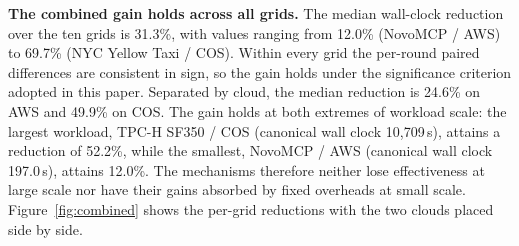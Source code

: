 \textbf{The combined gain holds across all grids.}
The median wall-clock reduction over the ten grids is 31.3\%, with values
ranging from 12.0\% (NovoMCP / AWS) to 69.7\% (NYC Yellow Taxi / COS). Within
every grid the per-round paired differences are consistent in sign, so the gain
holds under the significance criterion adopted in this paper. Separated by
cloud, the median reduction is 24.6\% on AWS and 49.9\% on COS. The gain holds
at both extremes of workload scale: the largest workload, TPC-H SF350 / COS
(canonical wall clock 10{,}709\,s), attains a reduction of 52.2\%, while the
smallest, NovoMCP / AWS (canonical wall clock 197.0\,s), attains 12.0\%. The
mechanisms therefore neither lose effectiveness at large scale nor have their
gains absorbed by fixed overheads at small scale. Figure~\ref{fig:combined}
shows the per-grid reductions with the two clouds placed side by side.

